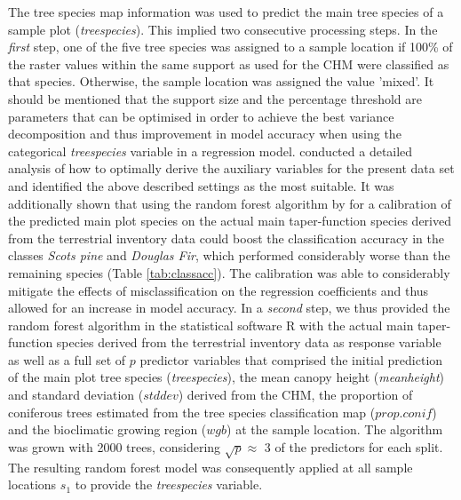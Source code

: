 The tree species map information was used to predict the main tree species of a sample plot (\textit{treespecies}). This implied two consecutive processing steps. In the \textit{first} step, one of the five tree species was assigned to a sample location if 100\% of the raster values within the same support as used for the CHM were classified as that species. Otherwise, the sample location was assigned the value 'mixed'. It should be mentioned that the support size and the percentage threshold are parameters that can be optimised in order to achieve the best variance decomposition and thus improvement in model accuracy when using the categorical \textit{treespecies} variable in a regression model. \citet{hill2017a} conducted a detailed analysis of how to optimally derive the auxiliary variables for the present data set and identified the above described settings as the most suitable. It was additionally shown that using the random forest algorithm by \citet{breiman2001} for a calibration of the predicted main plot species on the actual main taper-function species derived from the terrestrial inventory data could boost the classification accuracy in the classes \textit{Scots pine} and \textit{Douglas Fir}, which performed considerably worse than the remaining species (Table \ref{tab:classacc}). The calibration was able to considerably mitigate the effects of misclassification on the regression coefficients and thus allowed for an increase in model accuracy. In a \textit{second} step, we thus provided the random forest algorithm in the statistical software R \citep{R} with the actual main taper-function species derived from the terrestrial inventory data as response variable as well as a full set of $p$ predictor variables that comprised the initial prediction of the main plot tree species (\textit{treespecies}), the mean canopy height (\textit{meanheight}) and standard deviation ($stddev$) derived from the CHM, the proportion of coniferous trees estimated from the tree species classification map ($prop.conif$) and the bioclimatic growing region ($wgb$) at the sample location. The algorithm was grown with 2000 trees, considering $\sqrt{p} \approx$ 3 of the predictors for each split. The resulting random forest model was consequently applied at all sample locations $s_1$ to provide the \textit{treespecies} variable.

